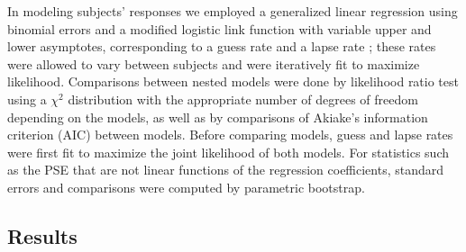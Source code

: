 \documentclass[../manuscript]{subfiles}
\begin{document}
In modeling subjects' responses we employed a generalized linear regression using binomial errors and a modified logistic link function with variable upper and lower asymptotes, corresponding to a guess rate and a lapse rate \citep{Wichmann:2001kx};  these rates were allowed to vary between subjects and were iteratively fit to maximize likelihood. Comparisons between nested models were done by likelihood ratio test using a $\chi^2$ distribution with the appropriate number of degrees of freedom depending on the models, as well as by comparisons of Akiake's information criterion (AIC) between models. Before comparing models, guess and lapse rates were first fit to maximize the joint likelihood of both models. For statistics such as the PSE that are not linear functions of the regression coefficients, standard errors and comparisons were computed by parametric bootstrap. 

\subsection{Results}
\end{document}
